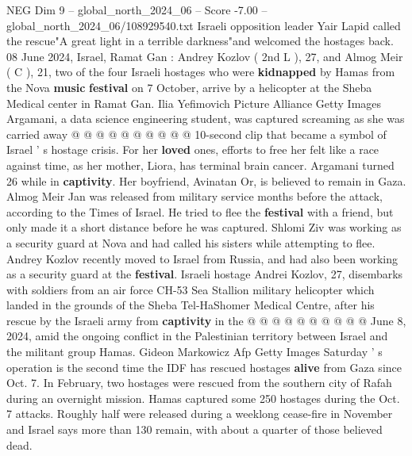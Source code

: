 \begin{textsample}{NEG Dim 9 – global\_north\_2024\_06 – Score -7.00 – global\_north\_2024\_06/108929540.txt}
Israeli opposition leader Yair Lapid called the rescue"A great light in a terrible darkness"and welcomed the hostages back. 08 June 2024, Israel, Ramat Gan : Andrey Kozlov ( 2nd L ), 27, and Almog Meir ( C ), 21, two of the four Israeli hostages who were \textbf{kidnapped} by Hamas from the Nova \textbf{music} \textbf{festival} on 7 October, arrive by a helicopter at the Sheba Medical center in Ramat Gan.
Ilia Yefimovich Picture Alliance Getty Images Argamani, a data science engineering student, was captured screaming as she was carried away @ @ @ @ @ @ @ @ @ @ 10-second clip that became a symbol of Israel ' s hostage crisis.
For her \textbf{loved} ones, efforts to free her felt like a race against time, as her mother, Liora, has terminal brain cancer.
Argamani turned 26 while in \textbf{captivity}.
Her boyfriend, Avinatan Or, is believed to remain in Gaza.
Almog Meir Jan was released from military service months before the attack, according to the Times of Israel.
He tried to flee the \textbf{festival} with a friend, but only made it a short distance before he was captured.
Shlomi Ziv was working as a security guard at Nova and had called his sisters while attempting to flee.
Andrey Kozlov recently moved to Israel from Russia, and had also been working as a security guard at the \textbf{festival}.
Israeli hostage Andrei Kozlov, 27, disembarks with soldiers from an air force CH-53 Sea Stallion military helicopter which landed in the grounds of the Sheba Tel-HaShomer Medical Centre, after his rescue by the Israeli army from \textbf{captivity} in the @ @ @ @ @ @ @ @ @ @ June 8, 2024, amid the ongoing conflict in the Palestinian territory between Israel and the militant group Hamas.
Gideon Markowicz Afp Getty Images Saturday ' s operation is the second time the IDF has rescued hostages \textbf{alive} from Gaza since Oct. 7.
In February, two hostages were rescued from the southern city of Rafah during an overnight mission.
Hamas captured some 250 hostages during the Oct. 7 attacks.
Roughly half were released during a weeklong cease-fire in November and Israel says more than 130 remain, with about a quarter of those believed dead.

\end{textsample}
